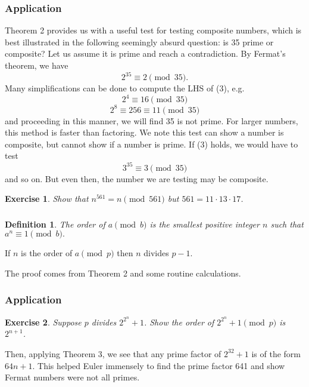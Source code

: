 \documentclass{article}
\newtheorem{exercise}{Exercise}
\newtheorem{defn}{Definition}
\begin{document}
\subsubsection{Application}
Theorem 2 provides us with a useful test for testing composite numbers, which is best illustrated in the following seemingly absurd question:
    is 35 prime or composite? Let us assume it is prime and reach a contradiction. By Fermat's theorem, we have
    \begin{equation}
        2^{35} \equiv 2 \pmod{35}.
    \end{equation}
Many simplifications can be done to compute the LHS of (3), e.g.
\begin{equation}
    2^{4} \equiv 16 \pmod{35}
\end{equation}
\begin{equation}
    2^{8} \equiv 256 \equiv 11 \pmod{35}
\end{equation}
and proceeding in this manner, we will find 35 is not prime. For larger numbers, this method is faster than factoring. We note this test can show a number is composite, but cannot show if a number is prime. If (3) holds, we would have to test
\begin{equation}
        3^{35} \equiv 3 \pmod{35}
\end{equation}
and so on. But even then, the number we are testing may be composite.
\begin{exercise}
    Show that $n^{561} = n \pmod{561}$ but $561 = 11 \cdot 13 \cdot 17$.
\end{exercise}
\subsubsection{}
\begin{defn}
    The order of $a \pmod{b}$ is the smallest positive integer $n$ such that $a^{n} \equiv 1 \pmod{b}.$
\end{defn}
\begin{thm}[Lagrange]
    If $n$ is the order of $a \pmod{p}$ then $n$ divides $p-1$.
\end{thm}
The proof comes from Theorem 2 and some routine calculations.
\subsubsection{Application}
\begin{exercise}
    Suppose $p$ divides $2^{2^{n}}+1$. Show the order of $2^{2^{n}}+1 \pmod{p}$ is $2^{n+1}$.
\end{exercise}
Then, applying Theorem 3, we see that any prime factor of $2^{32}+1$ is of the form $64n+1$. This helped Euler immensely to find the prime factor 641 and show Fermat numbers were not all primes.
\end{document}
